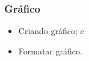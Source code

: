 \documentclass[aspectratio=169]{beamer} %
\begin{document}
\begin{frame}
	\frametitle{Gráfico}
			
	\begin{itemize} 
		\item Criando gráfico; e 
		\item Formatar gráfico.
	\end{itemize}
\end{frame}
\end{document}
